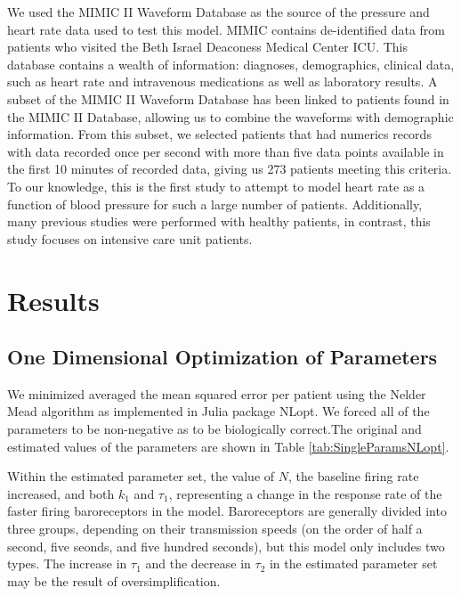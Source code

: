 \documentclass[fleqn,10pt]{wlscirep}
\begin{document}
We used the MIMIC II Waveform Database as the source of the pressure and heart rate data used to test this model.\cite{saeed2011multiparameter} MIMIC contains de-identified data from patients who visited the Beth Israel Deaconess Medical Center ICU. This database contains a wealth of information: diagnoses, demographics, clinical data, such as heart rate and intravenous medications as well as laboratory results.  
A subset of the MIMIC II Waveform Database has been linked to patients found in the MIMIC II Database, allowing us to combine the waveforms with demographic information. From this subset, we selected patients that had numerics records with data recorded once per second with more than five data points available in the first 10 minutes of recorded data, giving us 273 patients meeting this criteria.
To our knowledge, this is the first study to attempt to model heart rate as a function of blood pressure for such a large number of patients. Additionally, many previous studies were performed with healthy patients, in contrast, this study focuses on intensive care unit patients. 
\section*{Results}
\subsection*{One Dimensional Optimization of Parameters}
We minimized averaged the mean squared error per patient using the Nelder Mead algorithm as implemented in Julia package NLopt. We forced all of the parameters to be non-negative as to be biologically correct.The original and estimated values of the parameters are shown in Table \ref{tab:SingleParamsNLopt}. %

Within the estimated parameter set, the value of $N$, the baseline firing rate increased, and both $k_1$ and $\tau_1$, representing a change in the response rate of the faster firing baroreceptors in the model. Baroreceptors are generally divided into three groups, depending on their transmission speeds (on the order of half a second, five seonds, and five hundred seconds), but this model only includes two types. \cite{ottesen1996non} The increase in $\tau_1$ and the decrease in $\tau_2$ in the estimated parameter set may be the result of oversimplification. 
\end{document}
